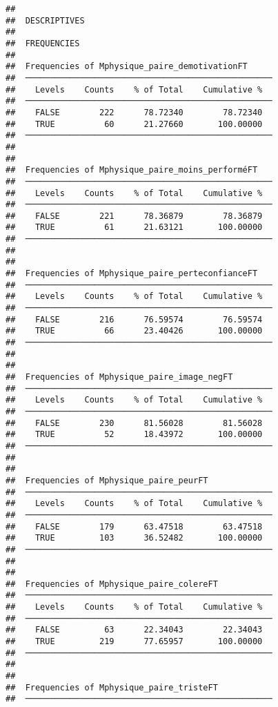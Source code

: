 \documentclass[
]{article}
\begin{document}
\begin{verbatim}
## 
##  DESCRIPTIVES
## 
##  FREQUENCIES
## 
##  Frequencies of Mphysique_paire_demotivationFT      
##  ────────────────────────────────────────────────── 
##    Levels    Counts    % of Total    Cumulative %   
##  ────────────────────────────────────────────────── 
##    FALSE        222      78.72340        78.72340   
##    TRUE          60      21.27660       100.00000   
##  ────────────────────────────────────────────────── 
## 
## 
##  Frequencies of Mphysique_paire_moins_performéFT    
##  ────────────────────────────────────────────────── 
##    Levels    Counts    % of Total    Cumulative %   
##  ────────────────────────────────────────────────── 
##    FALSE        221      78.36879        78.36879   
##    TRUE          61      21.63121       100.00000   
##  ────────────────────────────────────────────────── 
## 
## 
##  Frequencies of Mphysique_paire_perteconfianceFT    
##  ────────────────────────────────────────────────── 
##    Levels    Counts    % of Total    Cumulative %   
##  ────────────────────────────────────────────────── 
##    FALSE        216      76.59574        76.59574   
##    TRUE          66      23.40426       100.00000   
##  ────────────────────────────────────────────────── 
## 
## 
##  Frequencies of Mphysique_paire_image_negFT         
##  ────────────────────────────────────────────────── 
##    Levels    Counts    % of Total    Cumulative %   
##  ────────────────────────────────────────────────── 
##    FALSE        230      81.56028        81.56028   
##    TRUE          52      18.43972       100.00000   
##  ────────────────────────────────────────────────── 
## 
## 
##  Frequencies of Mphysique_paire_peurFT              
##  ────────────────────────────────────────────────── 
##    Levels    Counts    % of Total    Cumulative %   
##  ────────────────────────────────────────────────── 
##    FALSE        179      63.47518        63.47518   
##    TRUE         103      36.52482       100.00000   
##  ────────────────────────────────────────────────── 
## 
## 
##  Frequencies of Mphysique_paire_colereFT            
##  ────────────────────────────────────────────────── 
##    Levels    Counts    % of Total    Cumulative %   
##  ────────────────────────────────────────────────── 
##    FALSE         63      22.34043        22.34043   
##    TRUE         219      77.65957       100.00000   
##  ────────────────────────────────────────────────── 
## 
## 
##  Frequencies of Mphysique_paire_tristeFT            
##  ────────────────────────────────────────────────── 

\end{verbatim}
\end{document}
